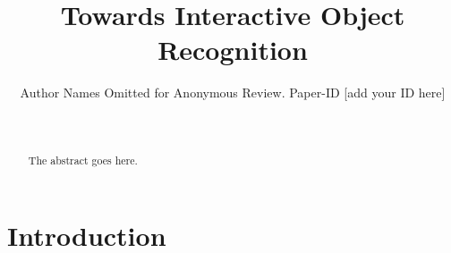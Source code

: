 \documentclass[conference]{IEEEtran}
\begin{document}
\title{Towards Interactive Object Recognition}

\author{Author Names Omitted for Anonymous Review. Paper-ID [add your ID here]}





% 
\author{\\
}

\maketitle

\begin{abstract}
The abstract goes here.
\end{abstract}

\IEEEpeerreviewmaketitle

\section{Introduction}

\end{document}
